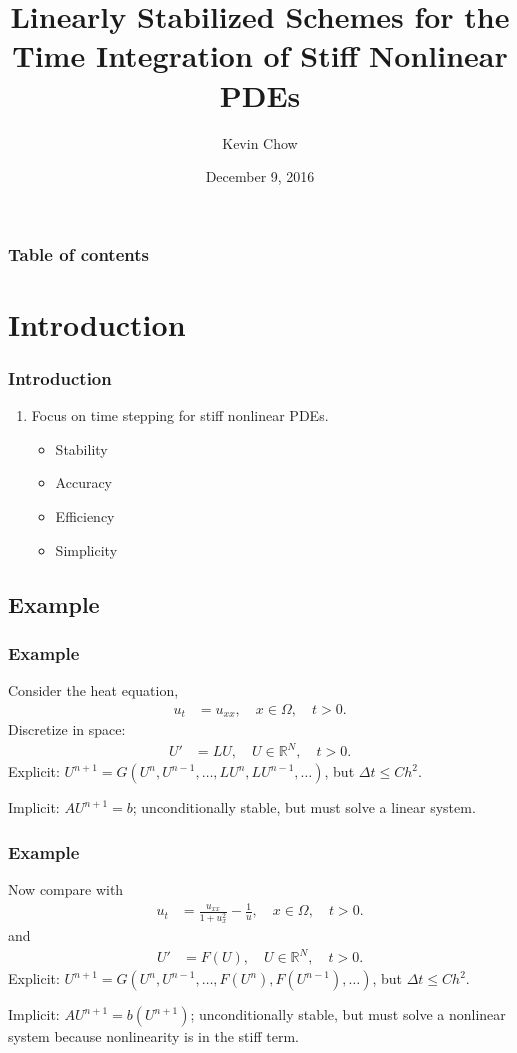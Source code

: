 \documentclass[hyperref={pdfpagelabels=false}]{beamer}
\title[Linearly Stabilized Schemes]{Linearly Stabilized Schemes for the Time Integration of Stiff Nonlinear PDEs}
\author[Kevin Chow]{Kevin Chow}
\date{December 9, 2016}
\begin{document}
\begin{frame}
\titlepage
\end{frame} 

\begin{frame}
\frametitle{Table of contents}
\tableofcontents
\end{frame} 

\section{Introduction} 
\begin{frame}
	\frametitle{Introduction}
\begin{enumerate}
	\item Focus on time stepping for stiff nonlinear PDEs.
	\begin{itemize}
		\item Stability
		\item Accuracy
		\item Efficiency
		\item Simplicity
	\end{itemize}
\end{enumerate}
\end{frame}

\subsection{Example}
\begin{frame}
	\frametitle{Example}
Consider the heat equation, 
	\begin{align*}
		u_t &= u_{xx}, \quad x \in \Omega, \quad t > 0.
	\end{align*}
Discretize in space:
	\begin{align*}
		U' &= LU, \quad U \in \mathbb{R}^N, \quad t > 0.
	\end{align*}
Explicit: $U^{n+1} = G(U^n,U^{n-1},\dots, LU^n, LU^{n-1},\dots)$, but $\Delta t \leq Ch^2$. 

Implicit: $AU^{n+1} = b$; unconditionally stable, but must solve a linear system. 
\end{frame}

\begin{frame}
	\frametitle{Example}
Now compare with 
	\begin{align*}
		u_t &= \frac{u_{xx}}{1 + u_x^2} - \frac{1}{u}, \quad x \in \Omega, \quad t > 0.
	\end{align*}
and 
	\begin{align*} 
		U' &= F(U), \quad U \in \mathbb{R}^N, \quad t > 0.
	\end{align*}
Explicit: $U^{n+1} = G(U^n,U^{n-1},\dots, F(U^n), F(U^{n-1}),\dots)$, but $\Delta t \leq Ch^2$. 

Implicit: $AU^{n+1} = b(U^{n+1})$; unconditionally stable, but must solve a nonlinear system because nonlinearity is in the stiff term. 
\end{frame}
\end{document}

